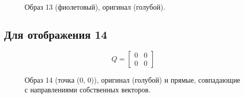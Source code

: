 \documentclass[a5paper, 10pt]{article}
\theoremstyle{definition}
\theoremstyle{plain}
\theoremstyle{remark}
\begin{document}
\begin{figure}[h]
\caption{Образ 13 (фиолетовый), оригинал (голубой).}
\end{figure}


\newpage
\subsection{Для отображения 14}
\begin{equation}
Q =
\begin{bmatrix}
0 & 0\\
0 & 0
\end{bmatrix}
\end{equation}

\begin{figure}[h]
\caption{Образ 14 (точка (0, 0)), оригинал (голубой) и прямые, совпадающие с направлениями собственных векторов.}
\end{figure}
\end{document}
